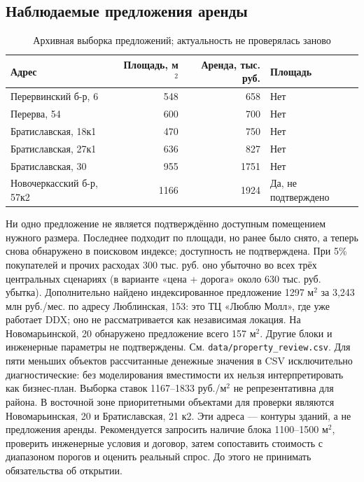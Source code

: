 \documentclass[12pt,a4paper]{article}
\begin{document}
\subsection{Наблюдаемые предложения аренды}
\begin{table}[H]\centering\caption{Архивная выборка предложений; актуальность не проверялась заново}\small\begin{tabularx}{\linewidth}{Yrrl}\toprule Адрес & Площадь, м$^2$ & Аренда, тыс. руб. & Площадь\\\midrule Перервинский б-р, 6 & 548 & 658 & Нет\\ Перерва, 54 & 600 & 700 & Нет\\ Братиславская, 18к1 & 470 & 750 & Нет\\ Братиславская, 27к1 & 636 & 827 & Нет\\ Братиславская, 30 & 955 & 1751 & Нет\\ Новочеркасский б-р, 57к2 & 1166 & 1924 & Да, не подтверждено\\\bottomrule\end{tabularx}\end{table}
Ни одно предложение не является подтверждённо доступным помещением нужного размера. Последнее подходит по площади, но ранее было снято, а теперь снова обнаружено в поисковом индексе; доступность не подтверждена. При 5\% покупателей и прочих расходах 300 тыс. руб. оно убыточно во всех трёх центральных сценариях (в варианте «цена + дорога» около 630 тыс. руб. убытка). Дополнительно найдено индексированное предложение 1297 м$^2$ за 3,243 млн руб./мес. по адресу Люблинская, 153: это ТЦ «Люблю Молл», где уже работает DDX; оно не рассматривается как независимая локация. На Новомарьинской, 20 обнаружено предложение всего 157 м$^2$. Другие блоки и инженерные параметры не подтверждены. См. \texttt{data/property\_review.csv}. Для пяти меньших объектов рассчитанные денежные значения в CSV исключительно диагностические: без моделирования вместимости их нельзя интерпретировать как бизнес-план. Выборка ставок 1167--1833 руб./м$^2$ не репрезентативна для района. В восточной зоне приоритетными объектами для проверки являются Новомарьинская, 20 и Братиславская, 21 к2. Эти адреса --- контуры зданий, а не предложения аренды. Рекомендуется запросить наличие блока 1100--1500 м$^2$, проверить инженерные условия и договор, затем сопоставить стоимость с диапазоном порогов и оценить реальный спрос. До этого не принимать обязательства об открытии.
\end{document}
